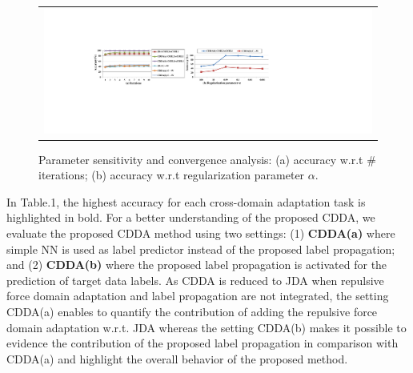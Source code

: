 \documentclass[10pt,twocolumn,letterpaper]{article}
\begin{document}
\begin{CJK*}{UTF8}{gkai}
	\begin{figure}[h!]
		\label{fig:analysis}
		\begin{center}
			\begin{tabular}{c}
				\includegraphics[width=1\linewidth]{2.pdf}
			\end{tabular}
		\end{center}
		\vspace{-11pt}
		\caption { Parameter sensitivity and convergence analysis: (a) accuracy w.r.t $\#$iterations; (b) accuracy w.r.t regularization parameter $\alpha$. } 
	\end{figure} 
	In Table.1, the highest accuracy for each cross-domain adaptation task is highlighted in  bold. For a better understanding of the proposed CDDA,  we evaluate the proposed CDDA method using two settings: (1) \textbf{CDDA(a)} where simple NN is used as label predictor instead of the proposed label propagation; and (2)  \textbf{CDDA(b)} where the proposed label propagation is activated for the prediction of target data labels. As CDDA is reduced to JDA when repulsive force domain adaptation and label propagation are not integrated, the setting CDDA(a) enables to quantify the contribution of adding the repulsive force domain adaptation w.r.t. JDA whereas the setting CDDA(b) makes it possible to evidence the contribution of the proposed label propagation in comparison with CDDA(a) and highlight the overall behavior of the proposed method.
    

\end{CJK*}
\end{document}

